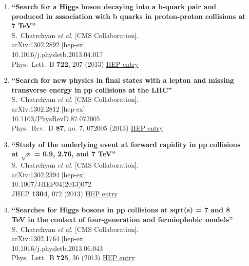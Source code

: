 \documentclass{article}
\begin{document}
\begin{enumerate}
\item%
{\bf ``Search for a Higgs boson decaying into a b-quark pair and produced in association with b quarks in proton-proton collisions at 7 TeV''}
  \\{}S.~Chatrchyan {\it et al.} [CMS Collaboration].
  \\{}arXiv:1302.2892 [hep-ex]
    \\{}10.1016/j.physletb.2013.04.017
\\{}Phys.\ Lett.\ B {\bf 722}, 207 (2013) %
\href{http://inspirehep.net/record/1219000}{HEP entry}


\item%
{\bf ``Search for new physics in final states with a lepton and missing transverse energy in pp collisions at the LHC''}
  \\{}S.~Chatrchyan {\it et al.} [CMS Collaboration].
  \\{}arXiv:1302.2812 [hep-ex]
    \\{}10.1103/PhysRevD.87.072005
\\{}Phys.\ Rev.\ D {\bf 87}, no. 7, 072005 (2013) %
\href{http://inspirehep.net/record/1218995}{HEP entry}


\item%
{\bf ``Study of the underlying event at forward rapidity in pp collisions at $\sqrt{s}$ = 0.9, 2.76, and 7 TeV''}
  \\{}S.~Chatrchyan {\it et al.} [CMS Collaboration].
  \\{}arXiv:1302.2394 [hep-ex]
    \\{}10.1007/JHEP04(2013)072
\\{}JHEP {\bf 1304}, 072 (2013) %
\href{http://inspirehep.net/record/1218372}{HEP entry}


\item%
{\bf ``Searches for Higgs bosons in pp collisions at sqrt(s) = 7 and 8 TeV in the context of four-generation and fermiophobic models''}
  \\{}S.~Chatrchyan {\it et al.} [CMS Collaboration].
  \\{}arXiv:1302.1764 [hep-ex]
    \\{}10.1016/j.physletb.2013.06.043
\\{}Phys.\ Lett.\ B {\bf 725}, 36 (2013) %
\href{http://inspirehep.net/record/1218021}{HEP entry}



\end{enumerate}
\end{document}
